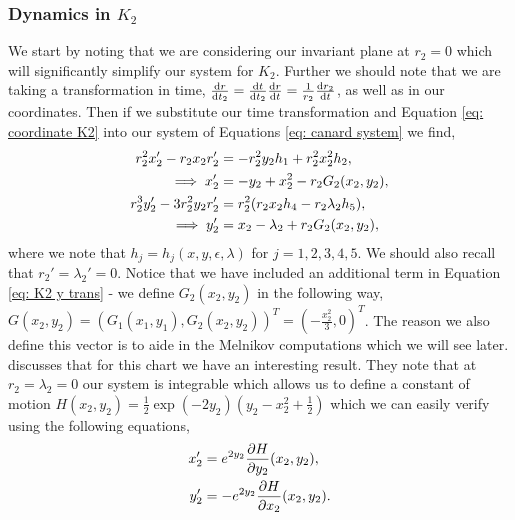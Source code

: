 \subsubsection{Dynamics in \texorpdfstring{$K_2$}{K2}}
We start by noting that we are considering our invariant plane at $r_2=0$ which will significantly simplify our system for $K_2$. Further we should note that we are taking a transformation in time, $\od{r}{t_2}=\od{t}{t_2}\od{r}{t}=\frac{1}{r_2}\od{r_2}{t}$, as well as in our coordinates. Then if we substitute our time transformation and Equation  \ref{eq: coordinate K2} into our system of Equations \ref{eq: canard system} we find, 
\begin{subequations}
	\begin{align}
	r_2^2x_2' - r_2x_2r_2'&=-r_2^2y_2h_1+r^2_2x^2_2h_2,\notag\\
	\implies x'_2&=-y_2+x_2^2-r_2G_2(x_2,y_2),\\
	r^3_2y_2'-3r_2^2y_2r_2'&=r^2_2(r_2x_2h_4-r_2\lambda_2h_5),\notag\\
	\implies y_2'&=x_2-\lambda_2+r_2G_2(x_2,y_2), \label{eq: K2 y trans}
	\end{align}
	\label{eq: reduced canard k2}
\end{subequations}
where we note that $h_j=h_j(x,y,\epsilon,\lambda)$ for $j=1,2,3,4,5$. We should also recall that $r_2'=\lambda_2'=0$. Notice that we have included an additional term in Equation \ref{eq: K2 y trans} - we define $G_2(x_2,y_2)$ in the following way, $G(x_2,y_2)=(G_1(x_1,y_1),G_2(x_2,y_2))^T=(-\frac{x^2_2}{3},0)^T$. The reason we also define this vector is to aide in the Melnikov computations which we will see later. \citet{krupa2001} discusses that for this chart we have an interesting result. They note that at $r_2=\lambda_2=0$ our system is integrable which allows us to define a constant of motion $H(x_2,y_2)=\frac{1}{2}\exp{(-2y_2)}\left(y_2-x^2_2+\frac{1}{2}\right)$ which we can easily verify \citep{krupa2001} using the following equations,
\begin{subequations}
	\begin{align}
	x'_2&=e^{2y_2}\pd{H}{y_2}(x_2,y_2),\\
	y_2'&=-e^{2y_2}\pd{H}{x_2}(x_2,y_2).
	\end{align}
\end{subequations}
